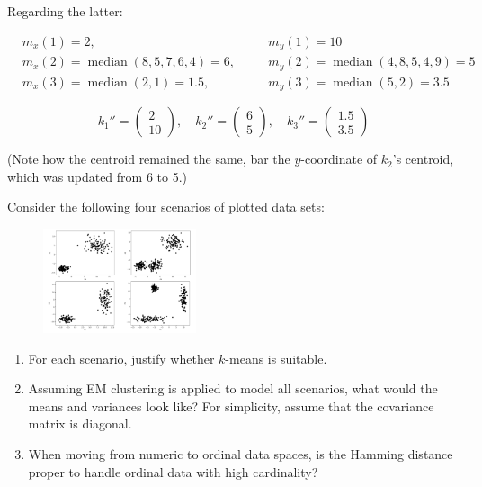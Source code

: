 \documentclass[12pt]{article}
\begin{document}
\begin{enumerate}[leftmargin=\labelsep]
  Regarding the latter:

  \begin{equation*}
    \begin{aligned}
       & m_x(1) = 2, \quad                                        &  & m_y(1) = 10                                       \\
       & m_x(2) = \operatorname{median}(8, 5, 7, 6, 4) = 6, \quad &  & m_y(2) = \operatorname{median}(4, 8, 5, 4, 9) = 5 \\
       & m_x(3) = \operatorname{median}(2, 1) = 1.5, \quad        &  & m_y(3) = \operatorname{median}(5, 2) = 3.5
    \end{aligned}
  \end{equation*}

  \begin{equation*}
    k_1'' = \begin{pmatrix} 2 \\ 10 \end{pmatrix}, \quad
    k_2'' = \begin{pmatrix} 6 \\ 5 \end{pmatrix}, \quad
    k_3'' = \begin{pmatrix} 1.5 \\ 3.5 \end{pmatrix}
  \end{equation*}

  (Note how the centroid remained the same, bar the $y$-coordinate of $k_2$'s centroid,
  which was updated from 6 to 5.)

  \begin{tcolorbox}[enhanced jigsaw,halign=center,colback=bg,boxrule=0pt,arc=1pt]

    Consider the following four scenarios of plotted data sets:

    \begin{figure}[H]
      \centering
      \includegraphics[width=0.4\textwidth]{assets/ex-9-plot.png}
    \end{figure}

    \begin{enumerate}
      \item For each scenario, justify whether $k$-means is suitable.
      \item Assuming EM clustering is applied to model all scenarios, what would
            the means and variances look like? For simplicity, assume that the covariance
            matrix is diagonal.
      \item When moving from numeric to ordinal data spaces, is the Hamming distance
            proper to handle ordinal data with high cardinality?
    \end{enumerate}


\end{tcolorbox}
\end{enumerate}
\end{document}
